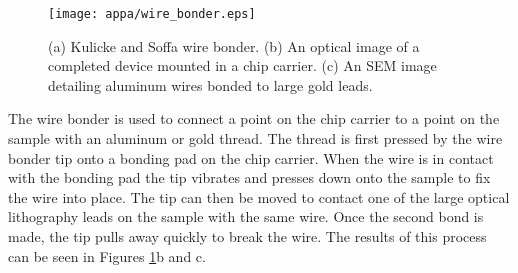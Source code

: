 \begin{figure}
	\centering
	\texttt{[image: appa/wire\_bonder.eps]}
	\caption{(a) Kulicke and Soffa wire bonder. (b) An optical image of a completed device mounted in a chip carrier. (c) An SEM image detailing aluminum wires bonded to large gold leads.}
	\label{fig:wire_bonder}
\end{figure}

The wire bonder is used to connect a point on the chip carrier to a point on the sample with an aluminum or gold thread. The thread is first pressed by the wire bonder tip onto a bonding pad on the chip carrier. When the wire is in contact with the bonding pad the tip vibrates and presses down onto the sample to fix the wire into place. The tip can then be moved to contact one of the large optical lithography leads on the sample with the same wire. Once the second bond is made, the tip pulls away quickly to break the wire. The results of this process can be seen in Figures \ref{fig:wire_bonder}b and c.

